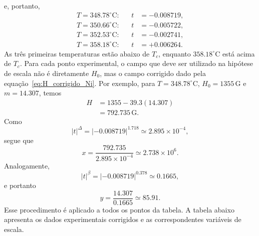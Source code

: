 \documentclass[11pt,a4paper]{article}
\begin{document}
%
e, portanto,
%
\begin{align}
    T=348.78^\circ\mathrm C:
    &&t&=-0.008719,
    \\
    T=350.66^\circ\mathrm C:
    &&t&=-0.005722,
    \\
    T=352.53^\circ\mathrm C:
    &&t&=-0.002741,
    \\
    T=358.18^\circ\mathrm C:
    &&t&=+0.006264.
\end{align}
%
As três primeiras temperaturas estão abaixo de $T_c$, enquanto
$358.18^\circ\mathrm C$ está acima de $T_c$.
%
Para cada ponto experimental, o campo que deve ser utilizado na
hipótese de escala não é diretamente $H_0$, mas o campo corrigido dado pela equação~\eqref{eq:H_corrigido_Ni}.
%
Por exemplo, para
$T=348.78^\circ\mathrm C$,
$H_0=1355\,\mathrm G$ e $m=14.307$, temos
%
\begin{align}
    H
    &=
    1355-39.3(14.307)
    \nonumber\\
    &=
    792.735\,\mathrm G.
\end{align}
%
Como
%
\begin{equation}
    |t|^\Delta
    =
    |{-0.008719}|^{1.718}
    \simeq2.895\times10^{-4},
\end{equation}
%
segue que
%
\begin{equation}
    x
    =
    \frac{792.735}{2.895\times10^{-4}}
    \simeq2.738\times10^6.
\end{equation}
%
Analogamente,
%
\begin{equation}
    |t|^\beta
    =
    |{-0.008719}|^{0.378}
    \simeq0.1665,
\end{equation}
%
e portanto
%
\begin{equation}
    y
    =
    \frac{14.307}{0.1665}
    \simeq85.91.
\end{equation}
%
Esse procedimento é aplicado a todos os pontos da tabela. A tabela abaixo apresenta os dados experimentais corrigidos e as correspondentes variáveis de escala.
%
\end{document}
